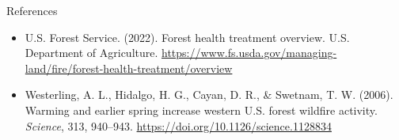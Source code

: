 \documentclass[10pt,aspectratio=169]{beamer}
\begin{document}
\begin{frame}[allowframebreaks]{References}
\begin{itemize}
    \item \hypertarget{ref:usfs2022}{U.S. Forest Service. (2022). Forest health treatment overview. U.S. Department of Agriculture. \href{https://www.fs.usda.gov/managing-land/fire/forest-health-treatment/overview}{https://www.fs.usda.gov/managing-land/fire/forest-health-treatment/overview}}
    \item \hypertarget{ref:westerling2006}{Westerling, A. L., Hidalgo, H. G., Cayan, D. R., \& Swetnam, T. W. (2006). Warming and earlier spring increase western U.S. forest wildfire activity. \textit{Science}, 313, 940--943. \href{https://doi.org/10.1126/science.1128834}{https://doi.org/10.1126/science.1128834}}
  \end{itemize}
\end{frame}
\end{document}
